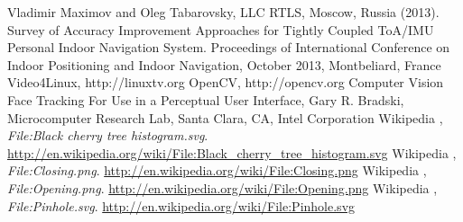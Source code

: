 \begin{thebibliography}{1}

  Vladimir Maximov and Oleg Tabarovsky, LLC RTLS, Moscow, Russia (2013). Survey of Accuracy Improvement Approaches for Tightly Coupled ToA/IMU Personal Indoor Navigation System. Proceedings of International Conference on Indoor Positioning and Indoor Navigation, October 2013, Montbeliard, France
Video4Linux, http://linuxtv.org
OpenCV, http://opencv.org
Computer Vision Face Tracking For Use in a Perceptual User Interface, 
Gary R. Bradski, Microcomputer Research Lab, Santa Clara, CA, Intel Corporation
  Wikipedia ,
  \emph{File:Black cherry tree histogram.svg}.
  \url{http://en.wikipedia.org/wiki/File:Black_cherry_tree_histogram.svg}
  Wikipedia ,
  \emph{File:Closing.png}.
  \url{http://en.wikipedia.org/wiki/File:Closing.png}
  Wikipedia ,
  \emph{File:Opening.png}.
  \url{http://en.wikipedia.org/wiki/File:Opening.png}
  Wikipedia ,
  \emph{File:Pinhole.svg}.
  \url{http://en.wikipedia.org/wiki/File:Pinhole.svg}
\end{thebibliography}
